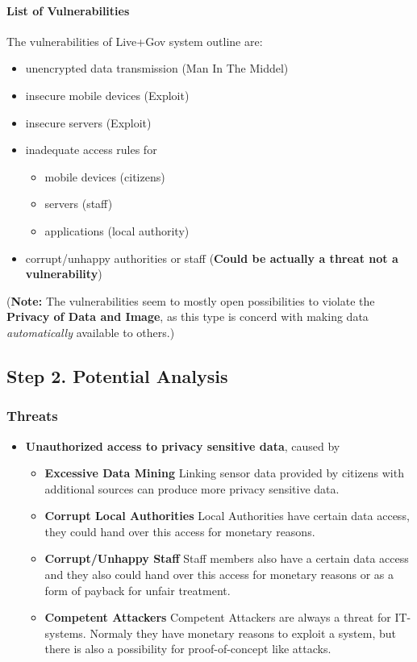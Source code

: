 \paragraph{List of Vulnerabilities}

The vulnerabilities of Live+Gov system outline are:

\begin{itemize}
\item
  unencrypted data transmission (Man In The Middel)
\item
  insecure mobile devices (Exploit)
\item
  insecure servers (Exploit)
\item
  inadequate access rules for
  \begin{itemize}
  \item
    mobile devices (citizens)
  \item
    servers (staff)
  \item
    applications (local authority)
  \end{itemize}
\item
  corrupt/unhappy authorities or staff (\textbf{Could be actually a
  threat not a vulnerability})
\end{itemize}

(\textbf{Note:} The vulnerabilities seem to mostly open possibilities to
violate the \textbf{Privacy of Data and Image}, as this type is concerd
with making data \emph{automatically} available to others.)

\subsection{Step 2. Potential Analysis}

\subsubsection{Threats}

\begin{itemize}
\itemsep1pt\parskip0pt
\item
  \textbf{Unauthorized access to privacy sensitive data}, caused by
  \begin{itemize}
  \item
    \textbf{Excessive Data Mining} Linking sensor data provided by
    citizens with additional sources can produce more privacy sensitive
    data.
  \item
    \textbf{Corrupt Local Authorities} Local Authorities have certain data
    access, they could hand over this access for monetary reasons.
  \item
    \textbf{Corrupt/Unhappy Staff} Staff members also have a certain data
    access and they also could hand over this access for monetary reasons
    or as a form of payback for unfair treatment.
  \item
    \textbf{Competent Attackers} Competent Attackers are always a threat
    for IT-systems. Normaly they have monetary reasons to exploit a
    system, but there is also a possibility for proof-of-concept like
    attacks.
  \end{itemize}
\end{itemize}

